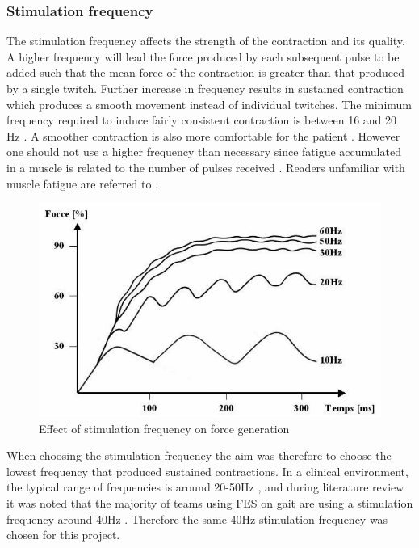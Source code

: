 \subsubsection{Stimulation frequency}
The stimulation frequency affects the strength of the contraction and its quality. A higher frequency will lead the force produced by each subsequent pulse to be added such that the mean force of the contraction is greater than that produced by a single twitch. Further increase in frequency results in sustained contraction which produces a smooth movement instead of individual twitches. The minimum frequency required to induce fairly consistent contraction is between 16 and 20 Hz \cite{marquez-chin_functional_2020}. A smoother contraction is also more comfortable for the patient \cite{wood_chapter_2020}. However one should not use a higher frequency than necessary since fatigue accumulated in a muscle is related to the number of pulses received \cite{bigland-ritchie_muscle_2000}. Readers unfamiliar with muscle fatigue are referred to \cite{thrasher_reducing_2005}.

\begin{figure} [H]
    \centering
    \includegraphics[width=0.7\linewidth]{images/stimfreq.png}
    \caption{Effect of stimulation frequency on force generation \cite{metrailler_systeme_2005}}
    \label{fig:stimfreq}
\end{figure}

When choosing the stimulation frequency the aim was therefore to choose the lowest frequency that produced sustained contractions. In a clinical environment, the typical range of frequencies is around 20-50Hz \cite{rupp_functional_2021}, and during literature review it was noted that the majority of teams using FES on gait are using a stimulation frequency around 40Hz \cite{aout_effects_2023}. Therefore the same 40Hz stimulation frequency was chosen for this project.



